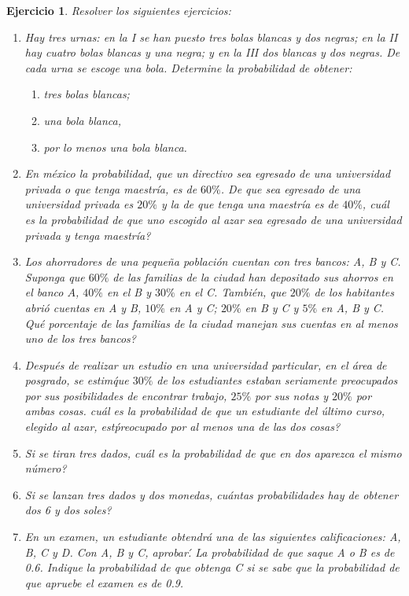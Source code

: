 \documentclass[12pt,twoside]{article}
\newtheorem{Ejer}{Ejercicio}
\begin{document}
\begin{Ejer} Resolver los siguientes ejercicios: 
\begin{enumerate}
\item Hay tres urnas: en la I se han puesto tres bolas blancas y dos negras; en la II hay cuatro bolas blancas y una negra; y en la III dos blancas y dos negras. De cada urna se escoge una bola. Determine la probabilidad de obtener:
\begin{enumerate}
\item tres bolas blancas;
\item una bola blanca,
\item por lo menos una bola blanca.
\end{enumerate}

\item En m\'exico la probabilidad, que un directivo sea egresado de una universidad privada o que tenga maestr\'ia, es de $60\%$. De que sea egresado de una universidad privada es $20\%$ y la de que tenga una maestr\'ia es de $40\%$,  cu\'al es la probabilidad de que uno escogido al azar sea egresado de una universidad privada y tenga maestr\'ia?

\item Los ahorradores de una peque\~na poblaci\'on cuentan con tres bancos: A, B y C. Suponga que $60\%$ de las familias de la ciudad han depositado sus ahorros en el banco $A$, $40\%$ en el B y $30\%$ en el C. Tambi\'en, que $20\%$  de los habitantes abri\'o cuentas en A y B, $10\%$  en A y C; $20\%$  en B y C y $5\%$ en A, B y C.  Qu\'e porcentaje de las familias de la ciudad manejan sus cuentas en al menos uno de los tres bancos?

\item Despu\'es de realizar un estudio en una universidad particular, en el \'area de posgrado, se estim\' que $30\%$  de los estudiantes estaban seriamente preocupados por sus posibilidades de encontrar trabajo, $25\%$  por sus notas y $20\%$ por ambas cosas.  cu\'al es la probabilidad de que un estudiante del \'ultimo curso, elegido al azar, est\' preocupado por al menos una de las dos cosas?

\item Si se tiran tres dados,  cu\'al es la probabilidad de que en dos aparezca el mismo n\'umero?

\item Si se lanzan tres dados y dos monedas,  cu\'antas probabilidades hay de obtener dos 6 y dos soles?

\item En un examen, un estudiante obtendr\'a una de las siguientes calificaciones: A, B, C y D. Con A, B y C, aprobar\'. La probabilidad de que saque A o B es de 0.6. Indique la probabilidad de que obtenga C si se sabe que la probabilidad de que apruebe el examen es de 0.9.


\end{enumerate}
\end{Ejer}
\end{document}
